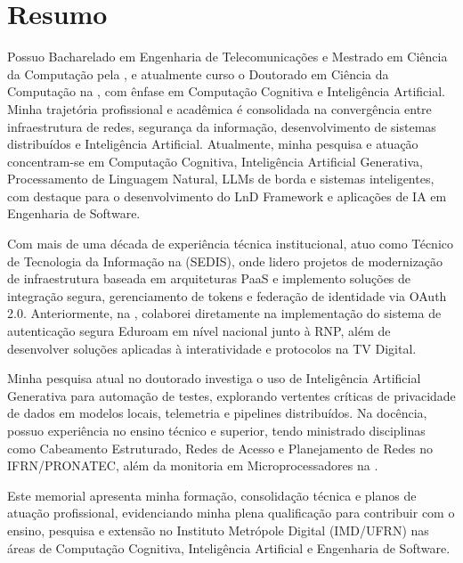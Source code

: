 \chapter*{Resumo}

Possuo Bacharelado em Engenharia de Telecomunicações e Mestrado em Ciência da Computação pela \UFF{}, e atualmente curso o Doutorado em Ciência da Computação na \UFRN{}, com ênfase em Computação Cognitiva e Inteligência Artificial. Minha trajetória profissional e acadêmica é consolidada na convergência entre infraestrutura de redes, segurança da informação, desenvolvimento de sistemas distribuídos e Inteligência Artificial. Atualmente, minha pesquisa e atuação concentram-se em Computação Cognitiva, Inteligência Artificial Generativa, Processamento de Linguagem Natural, LLMs de borda e sistemas inteligentes, com destaque para o desenvolvimento do LnD Framework e aplicações de IA em Engenharia de Software.

Com mais de uma década de experiência técnica institucional, atuo como Técnico de Tecnologia da Informação na \UFRN{} (SEDIS), onde lidero projetos de modernização de infraestrutura baseada em arquiteturas PaaS e implemento soluções de integração segura, gerenciamento de tokens e federação de identidade via OAuth 2.0. Anteriormente, na \UFF{}, colaborei diretamente na implementação do sistema de autenticação segura Eduroam em nível nacional junto à RNP, além de desenvolver soluções aplicadas à interatividade e protocolos na TV Digital.

Minha pesquisa atual no doutorado investiga o uso de Inteligência Artificial Generativa para automação de testes, explorando vertentes críticas de privacidade de dados em modelos locais, telemetria e pipelines distribuídos. Na docência, possuo experiência no ensino técnico e superior, tendo ministrado disciplinas como Cabeamento Estruturado, Redes de Acesso e Planejamento de Redes no IFRN/PRONATEC, além da monitoria em Microprocessadores na \UFF{}.

Este memorial apresenta minha formação, consolidação técnica e planos de atuação profissional, evidenciando minha plena qualificação para contribuir com o ensino, pesquisa e extensão no Instituto Metrópole Digital (IMD/UFRN) nas áreas de Computação Cognitiva, Inteligência Artificial e Engenharia de Software.